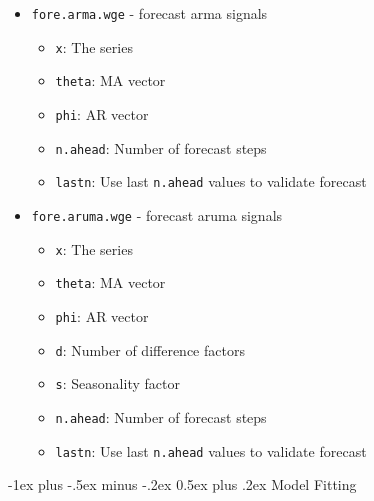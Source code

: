 \documentclass[a4paper]{article}
\makeatletter
\renewcommand{\section}{\@startsection{section}{1}{0mm}%
	{-1ex plus -.5ex minus -.2ex}%
	{0.5ex plus .2ex}%
	{\normalfont\large\bfseries}}
\makeatother
\begin{document}
\begin{multicols}{3}
		\begin{itemize}
			\item \texttt{fore.arma.wge} - forecast arma signals
			\begin{itemize}
				\item \texttt{x}: The series
				\item \texttt{theta}: MA vector
				\item \texttt{phi}: AR vector
				\item \texttt{n.ahead}: Number of forecast steps
				\item \texttt{lastn}: Use last \texttt{n.ahead} values to validate forecast
			\end{itemize}
			\item \texttt{fore.aruma.wge} - forecast aruma signals
			\begin{itemize}
				\item \texttt{x}: The series
				\item \texttt{theta}: MA vector
				\item \texttt{phi}: AR vector
				\item \texttt{d}: Number of difference factors
				\item \texttt{s}: Seasonality factor
				\item \texttt{n.ahead}: Number of forecast steps
				\item \texttt{lastn}: Use last \texttt{n.ahead} values to validate forecast
			\end{itemize}
		\end{itemize}

		\section{Model Fitting}
		

\end{multicols}
\end{document}
